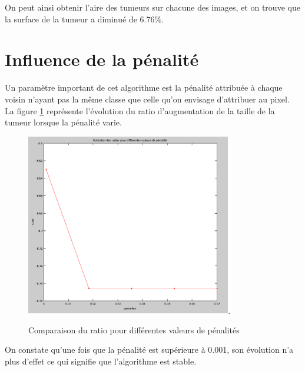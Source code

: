    On peut ainsi obtenir l'aire des tumeurs sur chacune des images, et on trouve que la surface de la tumeur a diminué de 6.76\%.

\section{Influence de la pénalité} %
\label{sub:influence_de_la_p_nalit_}
	Un paramètre important de cet algorithme est la pénalité attribuée à chaque voisin n'ayant pas la même classe que celle qu'on envisage d'attribuer au pixel. La figure \ref{fig:ratios} représente l'évolution du ratio d'augmentation de la taille de la tumeur lorsque la pénalité varie.

	\begin{figure}[H]
		\centering
		\includegraphics[width=0.8\textwidth]{images/3-ratios.png}.
		\caption{Comparaison du ratio pour différentes valeurs de pénalités}
		\label{fig:ratios}
	\end{figure}

	On constate qu'une fois que la pénalité est supérieure à 0.001, son évolution n'a plus d'effet ce qui signifie que l'algorithme est stable.

